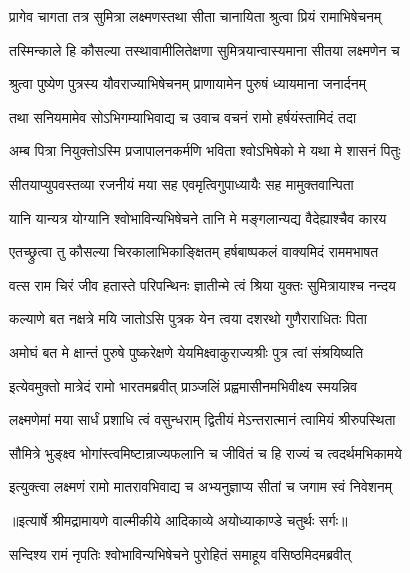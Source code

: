 \twolineshloka
{प्रागेव चागता तत्र सुमित्रा लक्ष्मणस्तथा}
{सीता चानायिता श्रुत्वा प्रियं रामाभिषेचनम्} %

\twolineshloka
{तस्मिन्काले हि कौसल्या तस्थावामीलितेक्षणा}
{सुमित्रयान्वास्यमाना सीतया लक्ष्मणेन च} %

\twolineshloka
{श्रुत्वा पुष्येण पुत्रस्य यौवराज्याभिषेचनम्}
{प्राणायामेन पुरुषं ध्यायमाना जनार्दनम्} %

\twolineshloka
{तथा सनियमामेव सोऽभिगम्याभिवाद्य च}
{उवाच वचनं रामो हर्षयंस्तामिदं तदा} %

\twolineshloka
{अम्ब पित्रा नियुक्तोऽस्मि प्रजापालनकर्मणि}
{भविता श्वोऽभिषेको मे यथा मे शासनं पितुः} %

\twolineshloka
{सीतयाप्युपवस्तव्या रजनीयं मया सह}
{एवमृत्विगुपाध्यायैः सह मामुक्तवान्पिता} %

\twolineshloka
{यानि यान्यत्र योग्यानि श्वोभाविन्यभिषेचने}
{तानि मे मङ्गलान्यद्य वैदेह्याश्चैव कारय} %

\twolineshloka
{एतच्छ्रुत्वा तु कौसल्या चिरकालाभिकाङ्क्षितम्}
{हर्षबाष्पकलं वाक्यमिदं राममभाषत} %

\twolineshloka
{वत्स राम चिरं जीव हतास्ते परिपन्थिनः}
{ज्ञातीन्मे त्वं श्रिया युक्तः सुमित्रायाश्च नन्दय} %

\twolineshloka
{कल्याणे बत नक्षत्रे मयि जातोऽसि पुत्रक}
{येन त्वया दशरथो गुणैराराधितः पिता} %

\twolineshloka
{अमोघं बत मे क्षान्तं पुरुषे पुष्करेक्षणे}
{येयमिक्ष्वाकुराज्यश्रीः पुत्र त्वां संश्रयिष्यति} %

\twolineshloka
{इत्येवमुक्तो मात्रेदं रामो भारतमब्रवीत्}
{प्राञ्जलिं प्रह्वमासीनमभिवीक्ष्य स्मयन्निव} %

\twolineshloka
{लक्ष्मणेमां मया सार्धं प्रशाधि त्वं वसुन्धराम्}
{द्वितीयं मेऽन्तरात्मानं त्वामियं श्रीरुपस्थिता} %

\twolineshloka
{सौमित्रे भुङ्क्ष्व भोगांस्त्वमिष्टान्राज्यफलानि च}
{जीवितं च हि राज्यं च त्वदर्थमभिकामये} %

\twolineshloka
{इत्युक्त्वा लक्ष्मणं रामो मातरावभिवाद्य च}
{अभ्यनुज्ञाप्य सीतां च जगाम स्वं निवेशनम्} %


{॥इत्यार्षे श्रीमद्रामायणे वाल्मीकीये आदिकाव्ये अयोध्याकाण्डे चतुर्थः सर्गः॥}


\twolineshloka
{सन्दिश्य रामं नृपतिः श्वोभाविन्यभिषेचने}
{पुरोहितं समाहूय वसिष्ठमिदमब्रवीत्} %

